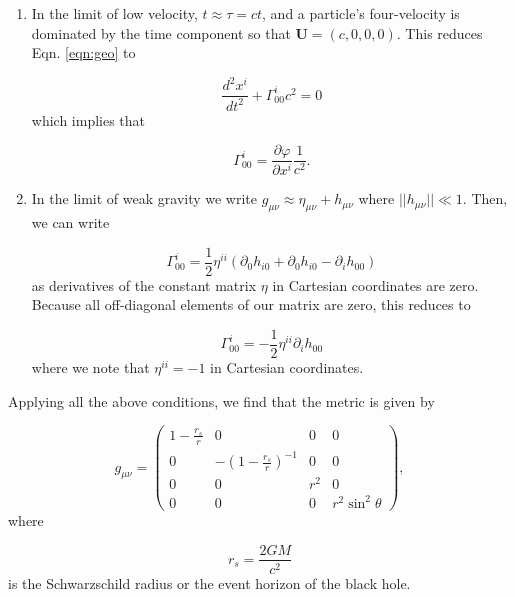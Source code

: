 \documentclass{CUP-JNL-DTM}%
\theoremstyle{definition}
\numberwithin{equation}{section}
\begin{document}
\begin{enumerate}
\item In the limit of low velocity, $t \approx \tau = ct$, and a particle's four-velocity is dominated by the time component so that $\textbf{U} = (c,0,0,0)$. This reduces Eqn. \ref{eqn:geo} to 

\begin{equation}
     \frac{d^2x^i}{dt^2} + \Gamma^i_{00}c^2 = 0
     \label{eqn:geo_low_v}
\end{equation}
which implies that 

\begin{equation}
    \Gamma^i_{00} = \frac{\partial \varphi}{\partial x^i}\frac{1}{c^2}. 
\end{equation}

\item In the limit of weak gravity we write $g_{\mu\nu} \approx \eta_{\mu\nu} + h_{\mu\nu}$ where $||h_{\mu\nu}|| \ll 1$. Then, we can write 

\begin{equation}
    \Gamma^i_{00} = \frac{1}{2}\eta^{ii}(\partial_0 h_{i0} + \partial_0h_{i0} - \partial_i h_{00})
\end{equation}
as derivatives of the constant matrix $\eta$ in Cartesian coordinates are zero. Because all off-diagonal elements of our matrix are zero, this reduces to 

\begin{equation}
    \Gamma^i_{00} = -\frac{1}{2}\eta^{ii}\partial_i h_{00}
\end{equation}
where we note that $\eta^{ii} = -1$ in Cartesian coordinates. 
\end{enumerate}

Applying all the above conditions, we find that the metric is given by

\begin{equation}
    g_{\mu\nu} = \begin{pmatrix}
        1 - \frac{r_s}{r} & 0 & 0 & 0 \\
        0 & -(1 - \frac{r_s}{r})^{-1} & 0 & 0 \\
        0 & 0 & r^2 & 0 \\
        0 & 0 & 0 & r^2\sin^2\theta
    \end{pmatrix},
\end{equation}
where 

\begin{equation}
    r_s = \frac{2GM}{c^2}
\end{equation}
is the Schwarzschild radius or the event horizon of the black hole. 
\end{document}
